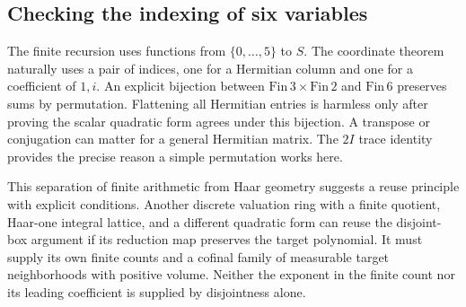 \documentclass[12pt,letterpaper]{article}
\begin{document}
\subsection{Checking the indexing of six variables}
The finite recursion uses functions from $\{0,\ldots,5\}$ to $S$. The coordinate theorem naturally uses a pair of indices, one for a Hermitian column and one for a coefficient of $1,i$. An explicit bijection between $\mathrm{Fin}\,3\times\mathrm{Fin}\,2$ and $\mathrm{Fin}\,6$ preserves sums by permutation. Flattening all Hermitian entries is harmless only after proving the scalar quadratic form agrees under this bijection. A transpose or conjugation can matter for a general Hermitian matrix. The $2I$ trace identity provides the precise reason a simple permutation works here.
\par
This separation of finite arithmetic from Haar geometry suggests a reuse principle with explicit conditions. Another discrete valuation ring with a finite quotient, Haar-one integral lattice, and a different quadratic form can reuse the disjoint-box argument if its reduction map preserves the target polynomial. It must supply its own finite counts and a cofinal family of measurable target neighborhoods with positive volume. Neither the exponent in the finite count nor its leading coefficient is supplied by disjointness alone.
\end{document}
